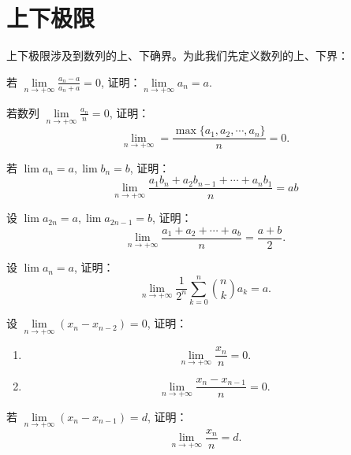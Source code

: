 \documentclass[lang=cn,10pt,twoside]{elegantbook}
\begin{document}
\section{上下极限}
上下极限涉及到数列的上、下确界。为此我们先定义数列的上、下界：

\begin{definition}
  
\end{definition}

\newpage
\begin{problemset}
  \item 若 $\lim\limits_{n \rightarrow +\infty} {\frac{a_n-a}{a_n+a}}=0$, 证明：$\lim\limits_{n \rightarrow +\infty} a_n = a.$
  \item 若数列 $\lim\limits_{n \rightarrow +\infty} {\frac{a_n}n} = 0$, 证明：
    \begin{equation*}
      \lim\limits_{n \rightarrow +\infty} = \frac{\max\{a_1, a_2, \cdots, a_n\}}{n} = 0.
    \end{equation*}
  \item 若 $\lim a_n = a, \lim b_n = b$, 证明：
    \begin{equation*}
      \lim_{n \rightarrow +\infty} \frac{a_1b_n + a_2b_{n-1} + \cdots + a_nb_1}{n} = ab
    \end{equation*}
  \item 设 $\lim a_{2n} = a, \lim a_{2n-1} = b$, 证明：
    \begin{equation*}
      \lim_{n \rightarrow +\infty} \frac{a_1+a_2+\cdots+a_b}{n} = \frac{a+b}{2}.
    \end{equation*}
  \item 设 $\lim a_n = a$, 证明：
    \begin{equation*}
      \lim_{n \rightarrow +\infty} \frac{1}{2^n} \sum_{k=0}^n \binom{n}{k}a_k = a.
    \end{equation*}
  \item 设 $\lim\limits_{n \rightarrow +\infty} (x_n - x_{n-2}) = 0$, 证明：
    \begin{enumerate}
      \item
      \begin{equation*}
        \lim_{n \rightarrow +\infty} \frac{x_n}{n} = 0.
      \end{equation*}

      \item 
      \begin{equation*}
        \lim_{n \rightarrow +\infty} \frac{x_n - x_{n-1}}{n} = 0.
      \end{equation*}
    \end{enumerate}
    \item 若 $\lim\limits_{n \rightarrow +\infty} (x_n - x_{n-1})=d$, 证明：
      \begin{equation*}
        \lim_{n \rightarrow +\infty}\frac{x_n}{n} = d.
      \end{equation*}
\end{problemset}
\end{document}
